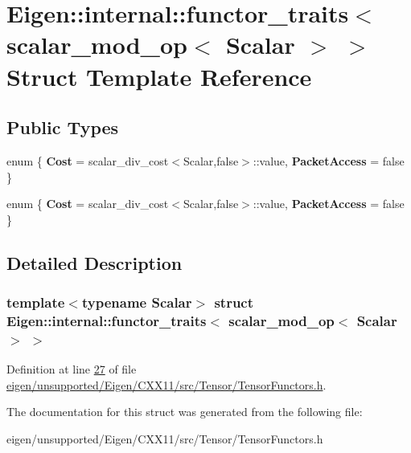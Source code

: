 \hypertarget{struct_eigen_1_1internal_1_1functor__traits_3_01scalar__mod__op_3_01_scalar_01_4_01_4}{}\section{Eigen\+:\+:internal\+:\+:functor\+\_\+traits$<$ scalar\+\_\+mod\+\_\+op$<$ Scalar $>$ $>$ Struct Template Reference}
\label{struct_eigen_1_1internal_1_1functor__traits_3_01scalar__mod__op_3_01_scalar_01_4_01_4}
\subsection*{Public Types}
\begin{DoxyCompactItemize}
\item 
\mbox{\label{struct_eigen_1_1internal_1_1functor__traits_3_01scalar__mod__op_3_01_scalar_01_4_01_4_a91fb10042ba2755205cc97e24db0ad31}} 
enum \{ {\bfseries Cost} = scalar\+\_\+div\+\_\+cost$<$Scalar,false$>$\+:\+:value, 
{\bfseries Packet\+Access} = false
 \}
\item 
\mbox{\label{struct_eigen_1_1internal_1_1functor__traits_3_01scalar__mod__op_3_01_scalar_01_4_01_4_a50a9dffc2902e94506ef67d051dcb9fb}} 
enum \{ {\bfseries Cost} = scalar\+\_\+div\+\_\+cost$<$Scalar,false$>$\+:\+:value, 
{\bfseries Packet\+Access} = false
 \}
\end{DoxyCompactItemize}


\subsection{Detailed Description}
\subsubsection*{template$<$typename Scalar$>$\newline
struct Eigen\+::internal\+::functor\+\_\+traits$<$ scalar\+\_\+mod\+\_\+op$<$ Scalar $>$ $>$}



Definition at line \hyperlink{eigen_2unsupported_2_eigen_2_c_x_x11_2src_2_tensor_2_tensor_functors_8h_source_l00027}{27} of file \hyperlink{eigen_2unsupported_2_eigen_2_c_x_x11_2src_2_tensor_2_tensor_functors_8h_source}{eigen/unsupported/\+Eigen/\+C\+X\+X11/src/\+Tensor/\+Tensor\+Functors.\+h}.



The documentation for this struct was generated from the following file\+:\begin{DoxyCompactItemize}
\item 
eigen/unsupported/\+Eigen/\+C\+X\+X11/src/\+Tensor/\+Tensor\+Functors.\+h\end{DoxyCompactItemize}
